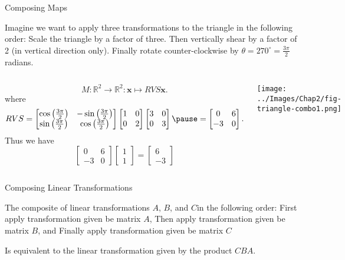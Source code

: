 \documentclass[xcoler=dvipsnames, aspectratio=169]{beamer}
\begin{document}
\begin{frame}{Composing Maps}

Imagine we want to apply three transformations to the triangle in the following order:
\bb
\ii Scale the triangle by a factor of three.
\ii Then vertically shear by a factor of 2 (in vertical direction only).
\ii Finally rotate counter-clockwise by $\theta = 270^{\circ}=\frac{3 \pi}{2}$ radians.
\ee

\begin{columns}[T]

\column{0.6\tw}

\[ M: \mathbb{R}^2 \to \mathbb{R}^2: \mathbf{x} \mapsto RVS \mathbf{x} .\]
\pause
where
\[ RVS =  \begin{bmatrix} \cos{\left( \frac{3 \pi}{2} \right)} & -\sin{\left( \frac{3 \pi}{2} \right)} \\ \sin{\left( \frac{3 \pi}{2} \right)} & \cos{\left( \frac{3 \pi}{2} \right)} \end{bmatrix} \begin{bmatrix} 1 & 0 \\ 0 & 2 \end{bmatrix} \begin{bmatrix} 3 & 0 \\ 0 & 3 \end{bmatrix}  \pause = 
 \begin{bmatrix} 0 & 6 \\ -3 & 0 \end{bmatrix}.\]
Thus we have
\pause
\[ \begin{bmatrix} 0 & 6 \\ -3 & 0 \end{bmatrix} \begin{bmatrix} 1 \\ 1 \end{bmatrix} = \begin{bmatrix} 6 \\ -3 \end{bmatrix} \]

\column{0.4\tw}

\texttt{[image: ../Images/Chap2/fig-triangle-combo1.png]}

\end{columns}

\end{frame}

\begin{frame}{Composing Linear Transformations}

\bbox
The composite of linear  transformations $A$, $B$, and $C$in the following order:
\bb
\ii First apply transformation given be matrix $A$,
\ii Then apply transformation given be matrix $B$, and 
\ii Finally apply transformation given be matrix $C$
\ee

Is equivalent to the linear transformation given by the product $CBA$. 
\ebox

\pause
{}

\end{frame}
\end{document}
